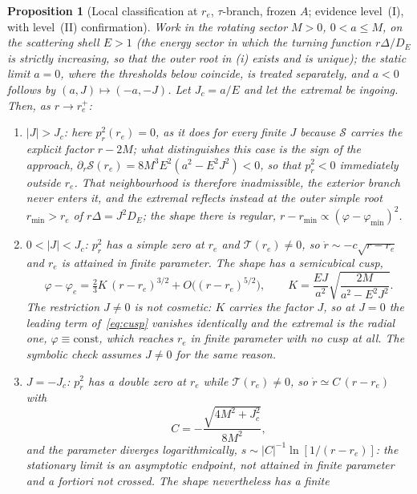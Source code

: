 \documentclass[12pt]{iopart}
\theoremstyle{plain}
\newtheorem{proposition}{Proposition}
\theoremstyle{definition}
\theoremstyle{remark}
\newcommand{\re}{r_{e}}
\newcommand{\Jc}{J_{c}}
\begin{document}
\begin{proposition}[Local classification at $\re$, $\tau$-branch, frozen $A$;
evidence level~(I), with level~(II) confirmation]
\label{prop:classification}
Work in the rotating sector $M>0$, $0<a\le M$, on the scattering shell $E>1$ (the
energy sector in which the turning function $r\Delta/D_E$ is strictly increasing, so
that the outer root in (i) exists and is unique); the static limit $a=0$, where the
thresholds below coincide, is treated separately, and $a<0$ follows by $(a,J)\mapsto(-a,-J)$.
Let $\Jc=a/E$ and let the extremal be ingoing. Then, as $r\to\re^+$:
\begin{enumerate}
\item[\rm(i)] $|J|>\Jc$: here $p_r^2(\re)=0$, as it does for every finite $J$
because $\mathcal S$ carries the explicit factor $r-2M$; what distinguishes this
case is the sign of the approach, $\partial_r\mathcal S(\re)=8M^3E^2(a^2-E^2J^2)<0$,
so that $p_r^2<0$ immediately outside $\re$. That neighbourhood is therefore
inadmissible, the exterior branch never enters it, and the extremal reflects
instead at the outer simple root $r_{\min}>\re$ of $r\Delta=J^2D_E$; the shape
there is regular, $r-r_{\min}\propto(\varphi-\varphi_{\min})^2$.
\item[\rm(ii)] $0<|J|<\Jc$: $p_r^2$ has a \emph{simple} zero at $\re$ and
$\mathcal T(\re)\neq0$, so $\dot r\sim-c\sqrt{r-\re}$ and $\re$ is attained in
\emph{finite} parameter. The shape has a semicubical cusp,
\begin{equation}
    \varphi-\varphi_e=\tfrac{2}{3}K\,(r-\re)^{3/2}+O\big((r-\re)^{5/2}\big),
    \qquad
    K=\frac{EJ}{a^2}\sqrt{\frac{2M}{a^2-E^2J^2}} .
    \label{eq:cusp}
\end{equation}
The restriction $J\neq0$ is not cosmetic: $K$ carries the factor $J$, so at $J=0$
the leading term of~\eqref{eq:cusp} vanishes identically and the extremal is the
radial one, $\varphi\equiv\text{const}$, which reaches $\re$ in finite parameter
with no cusp at all. The symbolic check assumes $J\neq0$ for the same reason.
\item[\rm(iii)] $J=-\Jc$: $p_r^2$ has a \emph{double} zero at $\re$ while
$\mathcal T(\re)\neq0$, so $\dot r\simeq C\,(r-\re)$ with
\begin{equation}
    C=-\frac{\sqrt{4M^2+\Jc^2}}{8M^2},
    \label{eq:retro-rate}
\end{equation}
and the parameter diverges logarithmically, $s\sim|C|^{-1}\ln[1/(r-\re)]$: the
stationary limit is an \emph{asymptotic endpoint}, not attained in finite
parameter and \emph{a fortiori} not crossed. The shape nevertheless has a finite

\end{enumerate}
\end{proposition}
\end{document}
